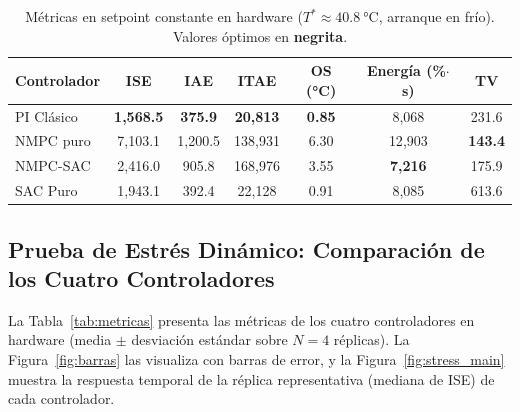 \documentclass[processes,article,submit,moreauthors,pdftex]{Definitions/mdpi}
\newcommand{\Tref}{T^*}
\begin{document}
\begin{table}[H]
\caption{Métricas en setpoint constante en hardware
         ($\Tref \approx \SI{40.8}{\celsius}$, arranque en frío). Valores
         óptimos en \textbf{negrita}.}
\label{tab:metricas_const}
\begin{tabular}{lcccccc}
\toprule
\textbf{Controlador} & \textbf{ISE} & \textbf{IAE} & \textbf{ITAE} &
\textbf{OS (\si{\celsius})} & \textbf{Energía (\%$\cdot$s)} & \textbf{TV} \\
\midrule
PI Clásico & \textbf{1{,}568.5} & \textbf{375.9} & \textbf{20{,}813}
           & \textbf{0.85} & 8{,}068 & 231.6 \\
NMPC puro  & 7{,}103.1 & 1{,}200.5 & 138{,}931 & 6.30 & 12{,}903 & \textbf{143.4} \\
NMPC-SAC   & 2{,}416.0 & 905.8 & 168{,}976 & 3.55 & \textbf{7{,}216} & 175.9 \\
SAC Puro   & 1{,}943.1 & 392.4 & 22{,}128 & 0.91 & 8{,}085 & 613.6 \\
\bottomrule
\end{tabular}
\end{table}

\subsection{Prueba de Estrés Dinámico: Comparación de los Cuatro Controladores}
\label{subsec:dyn_stress}

La Tabla~\ref{tab:metricas} presenta las métricas de los cuatro
controladores en hardware (media $\pm$ desviación estándar sobre $N=4$
réplicas). La Figura~\ref{fig:barras} las visualiza con barras de error, y
la Figura~\ref{fig:stress_main} muestra la respuesta temporal de la réplica
representativa (mediana de ISE) de cada controlador.
\end{document}
